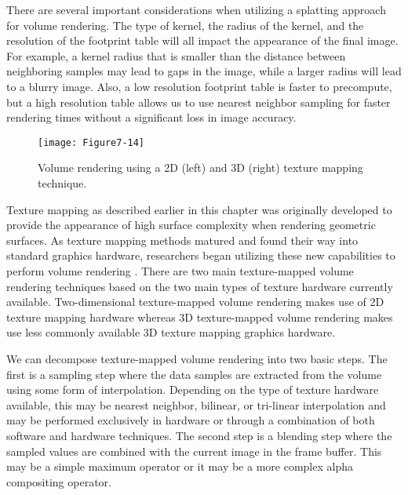 There are several important considerations when utilizing a splatting approach for volume rendering. The type of kernel, the radius of the kernel, and the resolution of the footprint table will all impact the appearance of the final image. For example, a kernel radius that is smaller than the distance between neighboring samples may lead to gaps in the image, while a larger radius will lead to a blurry image. Also, a low resolution footprint table is faster to precompute, but a high resolution table allows us to use nearest neighbor sampling for faster rendering times without a significant loss in image accuracy.

\begin{figure}[!htb]
	\texttt{[image: Figure7-14]}
	\caption{Volume rendering using a 2D (left) and 3D (right) texture mapping technique.}\label{fig:Figure7-14}
\end{figure}

Texture mapping as described earlier in this chapter was originally developed to provide the appearance of high surface complexity when rendering geometric surfaces. As texture mapping methods matured and found their way into standard graphics hardware, researchers began utilizing these new capabilities to perform volume rendering \cite{Cabral94}. There are two main texture-mapped volume rendering techniques based on the two main types of texture hardware currently available. Two-dimensional texture-mapped volume rendering makes use of 2D texture mapping hardware whereas 3D texture-mapped volume rendering makes use less commonly available 3D texture mapping graphics hardware.

We can decompose texture-mapped volume rendering into two basic steps. The first is a sampling step where the data samples are extracted from the volume using some form of interpolation. Depending on the type of texture hardware available, this may be nearest neighbor, bilinear, or tri-linear interpolation and may be performed exclusively in hardware or through a combination of both software and hardware techniques. The second step is a blending step where the sampled values are combined with the current image in the frame buffer. This may be a simple maximum operator or it may be a more complex alpha compositing operator.


